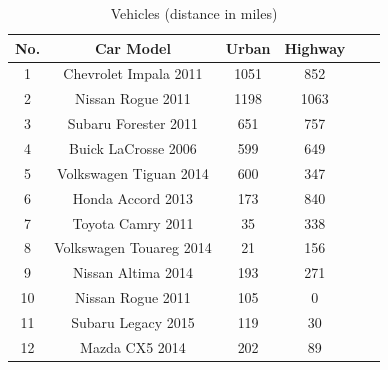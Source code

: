 \begin{table}[t]
        \centering
        \caption[vehicles]{Vehicles (distance in miles)}
         \vspace{0.5cm}
        \label{vehicles}
                \begin{tabular}{|c|c|c|c|c|c|}
                \hline
No. & Car Model  & Urban & Highway  
\\  \hline      \hline
1  & Chevrolet Impala 2011 &  1051   &  852
\\  \hline
2 & Nissan Rogue 2011   &  1198 &  1063 
\\   \hline
3 & Subaru Forester 2011 & 651  & 757
\\   \hline
4  &Buick LaCrosse 2006 & 599  & 649 
\\   \hline
5  & Volkswagen Tiguan 2014  & 600  & 347 
\\   \hline
6 & Honda Accord  2013 & 173 & 840
\\   \hline
7 & Toyota Camry 2011    & 35  &  338
\\   \hline
8  & Volkswagen Touareg 2014  & 21  & 156 
\\   \hline
9 & Nissan Altima 2014  & 193 & 271
\\ \hline
10 & Nissan Rogue 2011   & 105  &  0 
\\ \hline
11 & Subaru Legacy 2015 & 119 & 30
\\   \hline
12 & Mazda CX5 2014 & 202  & 89
\\   \hline
    \end{tabular}
\end{table}


